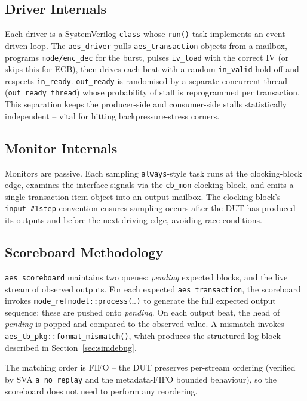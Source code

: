 \documentclass[conference,10pt,a4paper]{IEEEtran}
\begin{document}
\subsection{Driver Internals}
Each driver is a SystemVerilog \texttt{class} whose \texttt{run()}
task implements an event-driven loop.  The \texttt{aes\_driver} pulls
\texttt{aes\_transaction} objects from a mailbox, programs
\texttt{mode/enc\_dec} for the burst, pulses \texttt{iv\_load} with the
correct IV (or skips this for ECB), then drives each beat with a random
\texttt{in\_valid} hold-off and respects \texttt{in\_ready}.
\texttt{out\_ready} is randomised by a separate concurrent thread
(\texttt{out\_ready\_thread}) whose probability of stall is reprogrammed
per transaction.  This separation keeps the producer-side and
consumer-side stalls statistically independent -- vital for hitting
backpressure-stress corners.

\subsection{Monitor Internals}
Monitors are passive.  Each sampling \texttt{always}-style task runs at
the clocking-block edge, examines the interface signals via the
\texttt{cb\_mon} clocking block, and emits a single transaction-item
object into an output mailbox.  The clocking block's
\texttt{input\,\#1step} convention ensures sampling occurs after the DUT
has produced its outputs and before the next driving edge, avoiding
race conditions.

\subsection{Scoreboard Methodology}
\texttt{aes\_scoreboard} maintains two queues:
\textit{pending} expected blocks, and the live stream of observed outputs.
For each expected \texttt{aes\_transaction}, the scoreboard invokes
\texttt{mode\_refmodel::process(\dots)} to generate the full expected
output sequence; these are pushed onto \textit{pending}.
On each output beat, the head of \textit{pending} is popped and compared
to the observed value.  A mismatch invokes
\texttt{aes\_tb\_pkg::format\_mismatch()}, which produces the structured
log block described in Section~\ref{sec:simdebug}.

The matching order is FIFO -- the DUT preserves per-stream ordering
(verified by SVA \texttt{a\_no\_replay} and the metadata-FIFO bounded
behaviour), so the scoreboard does not need to perform any reordering.
\end{document}
